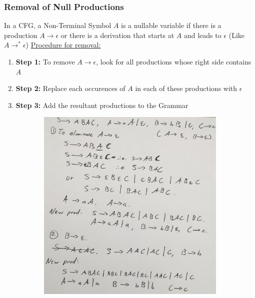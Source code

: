 \documentclass[20pt]{article} %
\begin{document}
\subsubsection{Removal of \textbf{Null Productions}}
In a CFG, a Non-Terminal Symbol $A$ is a nullable variable if there is a production $A \rightarrow \epsilon$ or there is a derivation that starts at $A$ and leads to $\epsilon$ (Like $A \rightarrow^{*} \epsilon$)
\underline{Procedure for removal:}
\begin{enumerate}
\item \textbf{Step 1:} To remove $A \rightarrow \epsilon$, look for all productions whose right side contains $A$
\item \textbf{Step 2:} Replace each occurences of $A$ in each of these productions with $\epsilon$
\item \textbf{Step 3:} Add the resultant productions to the Grammar
\end{enumerate}
\begin{figure}[!htbp]
  	\centering
   	\begin{subfigure}[p]{1.0\linewidth}
    	\includegraphics[width=\linewidth]{./figures/f-4.jpg}
   	\end{subfigure}
\end{figure}
\end{document}
